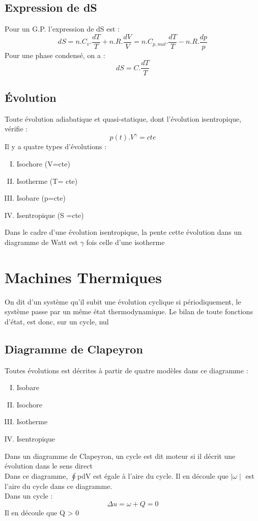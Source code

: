 \section{Expression de dS}
Pour un G.P. l'expression de dS est : 
$$dS = n.C_{v}.\dfrac{dT}{T}+n.R.\dfrac{dV}{V} = n.C_{p,mol}.\dfrac{dT}{T}-n.R.\dfrac{dp}{p}$$
Pour une phase condensé, on a :
$$dS = C.\dfrac{dT}{T}$$
\section{Évolution}
Toute évolution adiabatique et quasi-statique, dont l'évolution isentropique, vérifie : 
$$p(t).V^{\gamma}=cte$$
Il y a quatre types d'évolutions :
\begin{enumerate}[I) ]
 \item Isochore (V=cte)
 \item Isotherme (T= cte)
 \item Isobare (p=cte)
 \item Isentropique (S =cte)
\end{enumerate}
Dans le cadre d'une évolution isentropique, la pente cette évolution dans un diagramme de Watt est $\gamma$ fois celle d'une isotherme
\chapter{Machines Thermiques}
\begin{de}
 On dit d'un système qu'il subit une évolution cyclique si périodiquement, le système passe par un même état thermodynamique. Le bilan de toute fonctions d'état, est donc, sur un cycle, nul 
\end{de}
\section{Diagramme de Clapeyron}
Toutes évolutions est décrites à partir de quatre modèles dans ce diagramme :
\begin{enumerate}[I) ]
 \item Isobare
 \item Isochore
 \item Isotherme
 \item Isentropique
\end{enumerate}
Dans un diagramme de Clapeyron, un cycle est dit moteur si il décrit une évolution dans le sens direct\\
Dans ce diagramme, $\oint$pdV est égale à l'aire du cycle. Il en découle que $\mid \omega \mid$ est l'aire du cycle dans ce diagramme.\\
Dans un cycle : 
$$\Delta u = \omega + Q = 0$$
Il en découle que Q > 0
